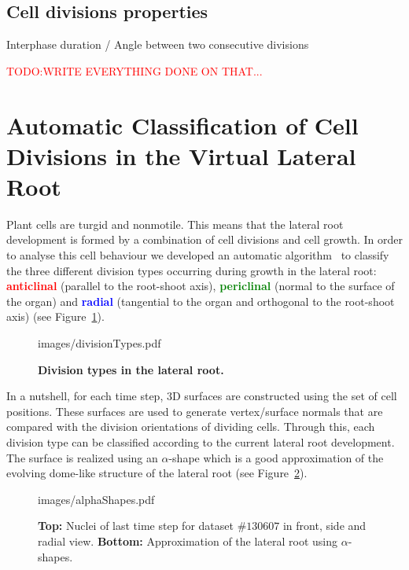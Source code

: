 \documentclass[11pt,a4paper, draft]{article}
\newcommand{\TODO}[1]{
\textcolor{red}{TODO:#1}
}
\begin{document}
\subsection{Cell divisions properties}
Interphase duration / Angle between two consecutive divisions
\TODO{WRITE EVERYTHING DONE ON THAT...}

\section{Automatic Classification of Cell Divisions in the Virtual Lateral Root}
\label{sec:divisionTypes}
\noindent
Plant cells are turgid and nonmotile. This means that the lateral root development is formed by a combination of cell divisions and cell growth. In order to analyse this cell behaviour we developed an automatic algorithm~\cite[chapter 4]{FangerauDiss_2015} to classify the three different division types occurring during growth in the lateral root: \textcolor{red}{\textbf{anticlinal}} (parallel to the root-shoot axis), \textcolor{green}{\textbf{periclinal}} (normal to the surface of the organ) and \textcolor{blue}{\textbf{radial}} (tangential to the organ and orthogonal to the root-shoot axis) (see Figure~\ref{fig:divisionTypes}).
%
\begin{figure}[htbp]
	\begin{center}
		\begin{overpic}[width=0.8\linewidth]{images/divisionTypes.pdf}
		\end{overpic}
\caption[Division types in the lateral root.]
{
{\bf Division types in the lateral root.}
}
	\label{fig:divisionTypes}
	\end{center}
\end{figure}
%
In a nutshell, for each time step, 3D surfaces are constructed using the set of cell positions. These surfaces are used to generate vertex/surface normals that are compared with the division orientations of dividing cells. Through this, each division type can be classified according to the current lateral root development. The surface is realized using an $\alpha$-shape which is a good approximation of the evolving dome-like structure of the lateral root (see Figure~\ref{fig:alphaShapes}).
%
\begin{figure}[htbp]
	\begin{center}
		\begin{overpic}[width=1.\linewidth]{images/alphaShapes.pdf}
		\end{overpic}
\caption[Approximation of the lateral root using $\alpha$-shapes.]
{
{\bf Top:} Nuclei of last time step for dataset $\# 130607$ in front, side and radial view. {\bf Bottom:} Approximation of the lateral root using $\alpha$-shapes.
}
	\label{fig:alphaShapes}
	\end{center}
\end{figure}
\end{document}
